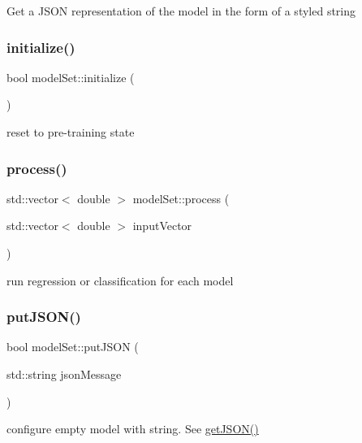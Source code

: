 Get a J\+S\+ON representation of the model in the form of a styled string \mbox{\label{classmodel_set_afefb50a0fe8f45821c6a7599784d7eb4}} 
\subsubsection{\texorpdfstring{initialize()}{initialize()}}
{\footnotesize\ttfamily bool model\+Set\+::initialize (\begin{DoxyParamCaption}{ }\end{DoxyParamCaption})}

reset to pre-\/training state \mbox{\label{classmodel_set_a232b11aa2987dd7db56c0f55edf868ea}} 
\subsubsection{\texorpdfstring{process()}{process()}}
{\footnotesize\ttfamily std\+::vector$<$ double $>$ model\+Set\+::process (\begin{DoxyParamCaption}\item[{std\+::vector$<$ double $>$}]{input\+Vector }\end{DoxyParamCaption})}

run regression or classification for each model \mbox{\label{classmodel_set_a09b07168fbe9d9377eb26f30bf16884c}} 
\subsubsection{\texorpdfstring{put\+J\+S\+O\+N()}{putJSON()}}
{\footnotesize\ttfamily bool model\+Set\+::put\+J\+S\+ON (\begin{DoxyParamCaption}\item[{std\+::string}]{json\+Message }\end{DoxyParamCaption})}

configure empty model with string. See \hyperlink{classmodel_set_a031987885b1462ec7d7dbeef0c803d97}{get\+J\+S\+O\+N()} \mbox{\label{classmodel_set_a8f7a837515889c6bddb3184a022b1727}} 
